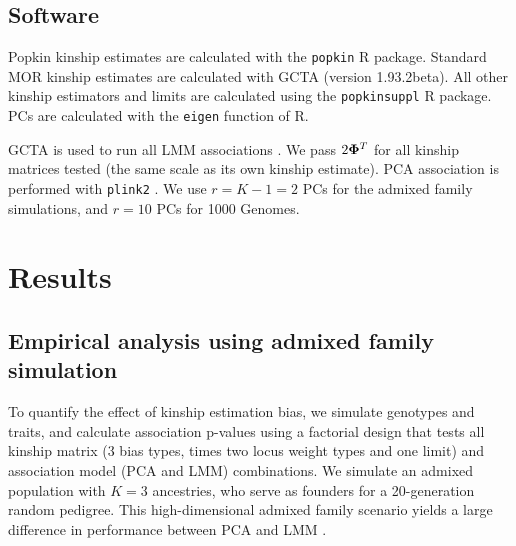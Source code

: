 \documentclass[11pt]{article}
\newcommand{\kinMat}[1][T]{%
  \ensuremath{%
    \mathbf{\Phi}^{#1}
  }%
  \xspace%
}%
\begin{document}
\begin{linenumbers}
\subsection{Software}

Popkin kinship estimates are calculated with the \texttt{popkin} R package.
Standard MOR kinship estimates are calculated with GCTA (version 1.93.2beta).
All other kinship estimators and limits are calculated using the \texttt{popkinsuppl} R package.
PCs are calculated with the \texttt{eigen} function of R.

GCTA is used to run all LMM associations \citep{yang_gcta:_2011, yang_advantages_2014}.
We pass $2 \kinMat$ for all kinship matrices tested (the same scale as its own kinship estimate).
PCA association is performed with \texttt{plink2} \citep{chang_second-generation_2015}.
We use $r = K - 1 = 2$ PCs for the admixed family simulations, and $r = 10$ PCs for 1000 Genomes.

\section{Results}

\subsection{Empirical analysis using admixed family simulation}

To quantify the effect of kinship estimation bias, we simulate genotypes and traits, and calculate association p-values using a factorial design that tests all kinship matrix (3 bias types, times two locus weight types and one limit) and association model (PCA and LMM) combinations.
We simulate an admixed population with $K=3$ ancestries, who serve as founders for a 20-generation random pedigree.
This high-dimensional admixed family scenario yields a large difference in performance between PCA and LMM \citep{yao_limitations_2022}.


\end{linenumbers}
\end{document}
